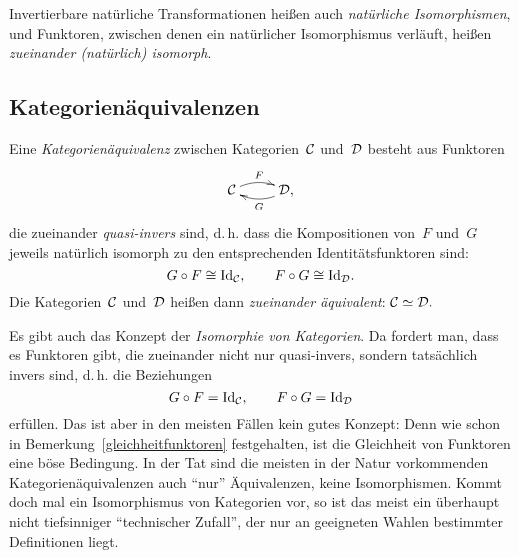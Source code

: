 \begin{defn}
Invertierbare natürliche Transformationen heißen auch \emph{natürliche
Isomorphismen}, und Funktoren, zwischen denen ein natürlicher Isomorphismus
verläuft, heißen \emph{zueinander (natürlich) isomorph}.
\end{defn}


\subsection{Kategorienäquivalenzen}

\begin{defn}\label{cateqv}
Eine \emph{Kategorienäquivalenz} zwischen Kategorien~$\mathcal{C}$ und~$\mathcal{D}$ besteht aus
Funktoren
\[ \xymatrix{\C \ar@/^/[r]^F & \D, \ar@/^/[l]^G} \]
die zueinander \emph{quasi-invers} sind, d.\,h. dass die Kompositionen von~$F$
und~$G$ jeweils natürlich isomorph zu den entsprechenden Identitätsfunktoren
sind:
\[ G \circ F \cong \mathrm{Id}_{\mathcal{C}}, \qquad F \circ G \cong \mathrm{Id}_{\mathcal{D}}. \]
Die Kategorien~$\mathcal{C}$ und~$\mathcal{D}$ heißen dann \emph{zueinander äquivalent}:
$\mathcal{C} \simeq \mathcal{D}.$
\end{defn}

Es gibt auch das Konzept der \emph{Isomorphie von Kategorien}. Da fordert man,
dass es Funktoren
 gibt, die
zueinander nicht nur quasi-invers, sondern tatsächlich invers sind, d.\,h. die
Beziehungen
\[ G \circ F = \mathrm{Id}_{\mathcal{C}}, \qquad F \circ G = \mathrm{Id}_{\mathcal{D}} \]
erfüllen. Das ist aber in den meisten Fällen kein gutes Konzept:
Denn wie schon in Bemerkung~\ref{gleichheitfunktoren} festgehalten, ist die
Gleichheit von Funktoren eine böse Bedingung. In der Tat sind die meisten in
der Natur vorkommenden Kategorienäquivalenzen auch "`nur"' Äquivalenzen, keine
Isomorphismen. Kommt doch mal ein Isomorphismus von Kategorien vor, so ist das
meist ein überhaupt nicht tiefsinniger "`technischer Zufall"', der nur an
geeigneten Wahlen bestimmter Definitionen liegt.

